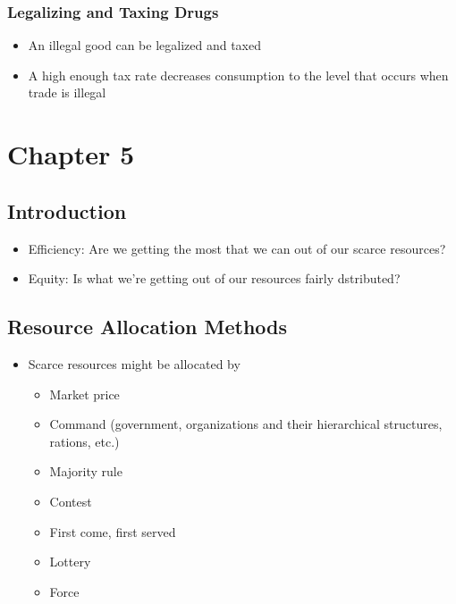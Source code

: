\documentclass[11pt]{article}
\begin{document}
\subsubsection{Legalizing and Taxing Drugs}
\label{sec:org72a7990}
\begin{itemize}
\item An illegal good can be legalized and taxed
\item A high enough tax rate decreases consumption to the level that occurs when trade is illegal
\end{itemize}
\section{Chapter 5}
\label{sec:org2251df8}
\subsection{Introduction}
\label{sec:org95c7ff2}
\begin{itemize}
\item Efficiency: Are we getting the most that we can out of our scarce resources?
\item Equity: Is what we're getting out of our resources fairly dstributed?
\end{itemize}
\subsection{Resource Allocation Methods}
\label{sec:orgd4497de}
\begin{itemize}
\item Scarce resources might be allocated by
\begin{itemize}
\item Market price
\item Command (government, organizations and their hierarchical structures, rations, etc.)
\item Majority rule
\item Contest
\item First come, first served
\item Lottery
\item Force
\end{itemize}
\end{itemize}
\end{document}
